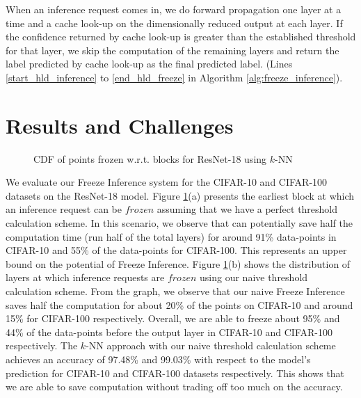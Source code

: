 \documentclass[letterpaper,twocolumn,10pt]{article}
\begin{document}
When an inference request comes in, we do forward propagation one layer at a time and a cache look-up on the dimensionally reduced output at each layer. If the confidence returned by cache look-up is greater than the established threshold for that layer, we skip the computation of the remaining layers and return the label predicted by cache look-up as the final predicted label. (Lines \ref{start_hld_inference} to \ref{end_hld_freeze} in Algorithm \ref{alg:freeze_inference}).
 \section{Results and Challenges}\label{sec:res}
\begin{figure}
\centering
    \vspace{-8pt}
\caption{\label{fig:knn}
\footnotesize
CDF of points frozen w.r.t. blocks for ResNet-18 using $k$-NN
}

\end{figure}
We evaluate our Freeze Inference system for the CIFAR-10\cite{cifar_10} and CIFAR-100\cite{cifar_100} datasets on the ResNet-18 model\cite{Resnet}. 
Figure \ref{fig:knn}(a) presents the earliest block at which an inference request can be $frozen$ assuming that we have a perfect threshold calculation scheme. In this scenario, we observe that can potentially save half the computation time (run half of the total layers) for around 91\% data-points in CIFAR-10  and 55\% of the data-points for CIFAR-100. This represents an upper bound on the potential of Freeze Inference. Figure \ref{fig:knn}(b) shows the distribution of layers at which inference requests are $frozen$ using our naive threshold calculation scheme. From the graph, we observe that our naive Freeze Inference saves half the computation for about 20\% of the points on CIFAR-10 and around 15\% for CIFAR-100 respectively. Overall, we are able to freeze about 95\% and 44\% of the data-points before the output layer in CIFAR-10 and CIFAR-100 respectively. The $k$-NN approach with our naive threshold calculation scheme achieves an accuracy of 97.48\% and 99.03\% with respect to the model's prediction for CIFAR-10 and CIFAR-100 datasets respectively. This shows that we are able to save computation without trading off too much on the accuracy.
\end{document}
